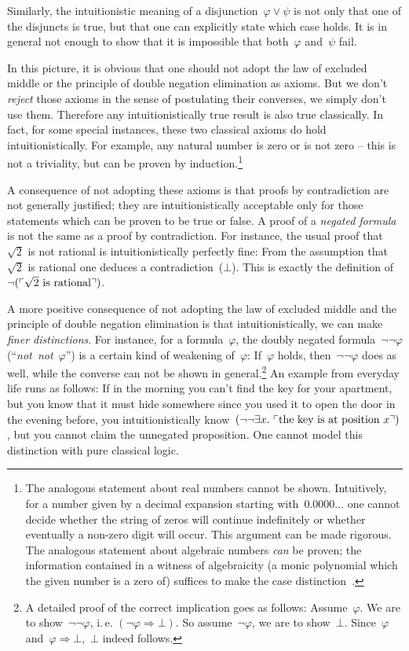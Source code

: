 \documentclass[10pt,reqno,a4paper]{amsbook}
\makeatletter
\theoremstyle{definition}
\theoremstyle{plain}
\theoremstyle{remark}
\newcommand{\?}{\,{:}\,}
\renewcommand{\_}{\mathpunct{.}\,}
\newcommand{\speak}[1]{\ulcorner\text{\textnormal{#1}}\urcorner}
\newcommand{\ie}{i.\,e.\@\xspace}
\newcommand{\notnot}{\emph{not~not}\xspace}
\makeatother
\begin{document}
Similarly, the intuitionistic meaning of a disjunction~$\varphi \vee \psi$ is
not only that one of the disjuncts is true, but that one can explicitly state
which case holds. It is in general not enough to show that it is impossible
that both~$\varphi$ and~$\psi$ fail.

In this picture, it is obvious that one should not adopt the law of excluded
middle or the principle of double negation elimination as axioms. But we
don't \emph{reject} those axioms in the sense of postulating their
converses, we simply don't use them. Therefore any intuitionistically
true result is also true classically. In fact, for some special instances,
these two classical axioms do hold intuitionistically. For example, any natural
number is zero or is not zero -- this is not a triviality, but can be proven by
induction.\footnote{The analogous statement about real numbers cannot be
shown. Intuitively, for a number given by a decimal expansion starting
with~$0.0000\ldots$ one cannot decide whether the string of zeros will continue
indefinitely or whether eventually a non-zero digit will occur. This argument
can be made rigorous. The analogous statement about algebraic numbers
\emph{can} be proven; the information contained in a witness of algebraicity (a
monic polynomial which the given number is a zero of) suffices to make the
case distinction~\cite[Chapter~VI.1, p.~140]{mines-richman-ruitenburg:constructive-algebra}.}

A consequence of not adopting these axioms is that proofs by contradiction are
not generally justified; they are intuitionistically acceptable only for those
statements which can be proven to be true or false. A proof of a
\emph{negated formula} is not the same as a proof by contradiction. For
instance, the usual proof that~$\sqrt{2}$ is not rational is
intuitionistically perfectly fine: From the assumption that~$\sqrt{2}$ is
rational one deduces a contradiction~($\bot$). This is exactly the definition
of~$\neg(\speak{$\sqrt{2}$ is rational})$.

A more positive consequence of not adopting the law of excluded middle and the
principle of double negation elimination is that intuitionistically, we can
make \emph{finer distinctions}. For instance, for a formula~$\varphi$, the doubly
negated formula~$\neg\neg\varphi$ (``\notnot~$\varphi$'') is a certain kind of weakening of~$\varphi$:
If~$\varphi$ holds, then~$\neg\neg\varphi$ does as well, while the converse can
not be shown in general.\footnote{A detailed proof of the correct implication
goes as follows: Assume~$\varphi$. We are to show~$\neg\neg\varphi$, \ie
$(\neg\varphi \Rightarrow \bot)$. So assume~$\neg\varphi$, we are to
show~$\bot$. Since~$\varphi$ and~$\varphi \Rightarrow \bot$,~$\bot$ indeed
follows.} An example from everyday life runs as follows: If in the morning you
can't find the key for your apartment, but you know that it must hide
somewhere since you used it to open the door in the evening before, you
intuitionistically know~$(\neg\neg\exists x\_ \speak{the key is at position
$x$})$, but you cannot claim the unnegated proposition. One cannot model this
distinction with pure classical logic.
\end{document}
